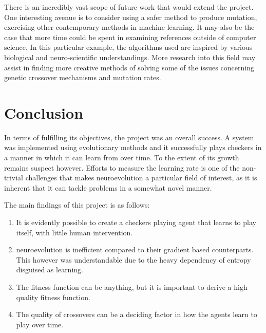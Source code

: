 \documentclass[12pt,a4paper]{article}
\begin{document}
        There is an incredibly vast scope of future work that would extend the project. One interesting avenue is to consider using a safer method to produce mutation, exercising other contemporary methods in machine learning. It may also be the case that more time could be spent in examining references outside of computer science. In this particular example, the algorithms used are inspired by various biological and neuro-scientific understandings. More research into this field may assist in finding more creative methods of solving some of the issues concerning genetic crossover mechanisms and mutation rates.


\section{Conclusion}

    In terms of fulfilling its objectives, the project was an overall success. A system was implemented using evolutionary methods and it successfully plays checkers in a manner in which it can learn from over time. To the extent of its growth remains suspect however. Efforts to measure the learning rate is one of the non-trivial challenges that makes neuroevolution a particular field of interest, as it is inherent that it can tackle problems in a somewhat novel manner.
    
    The main findings of this project is as follows:
    \begin{enumerate}
    \item It is evidently possible to create a checkers playing agent that learns to play itself, with little human intervention.
    \item  neuroevolution is inefficient compared to their gradient based counterparts. This however was understandable due to the heavy dependency of entropy disguised as learning.
    \item  The fitness function can be anything, but it is important to derive a high quality fitness function.
    \item The quality of crossovers can be a deciding factor in how the agents learn to play over time.
    \end{enumerate}
\end{document}
